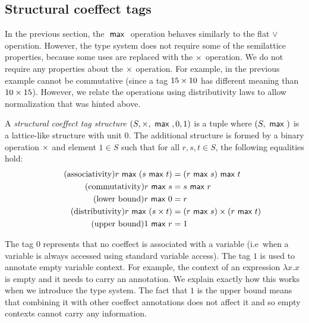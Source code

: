 
\subsection{Structural coeffect tags}
In the previous section, the $~\textnormal{\sffamily max}~$ operation behaves similarly to the flat $\vee$ operation.
However, the type system does not require some of the semilattice properties, because some uses
are replaced with the $\times$ operation. We do not require any properties about the $\times$ operation.
For example, in the previous example cannot be commutative (since a tag $15 \times 10$ has different 
meaning than $10 \times 15$). However, we relate the operations using distributivity laws to allow 
normalization that was hinted above.

\begin{definition}
A \emph{structural coeffect tag structure} $(S, \times, ~\textnormal{\sffamily max}~, 0, 1)$ is a tuple where 
$(S, ~\textnormal{\sffamily max}~)$ is a lattice-like structure with unit $0$. The additional structure is formed
by a binary operation $\times$ and element $1\in S$ such that
for all $r,s,t\in S$, the following equalities hold: 
%
\begin{subequations}
\begin{align}
\tag{associativity}
r \cvop (s \cvop t) &= (r \cvop s) \cvop t\\
\tag{commutativity}
r \cvop s &= s \cvop r\\
\tag{lower bound}
r \cvop 0 &= r\\
\tag{distributivity}
r \cvop (s \cprd t) &= (r \cvop s) \cprd (r \cvop t)\\
\tag{upper bound}
1 \cvop r &= 1
\end{align}
\end{subequations}
%
\end{definition}
%
%
%
The tag $0$ represents that no coeffect is associated with a variable (i.e~when a variable is
always accessed using standard variable access). The tag $1$ is used to annotate empty 
variable context. For example, the context of an expression $\lambda x.x$ is empty and it needs
to carry an annotation. We explain exactly how this works when we introduce the type system.
The fact that $1$ is the upper bound means that combining it with other coeffect annotations
does not affect it and so empty contexts cannot carry any information.

